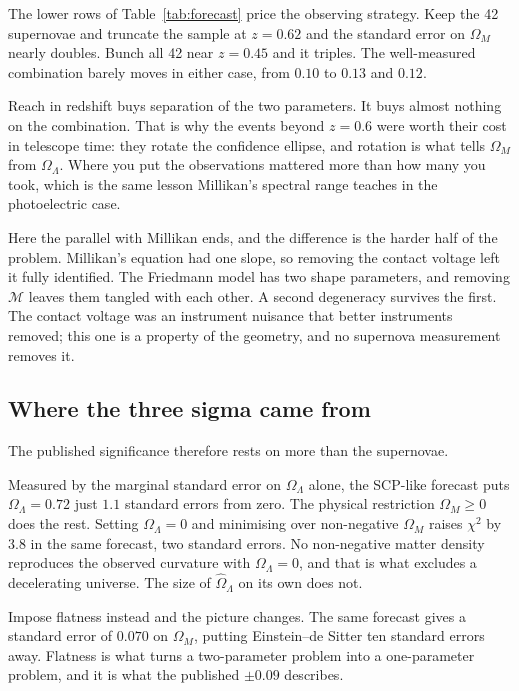 \documentclass[11pt]{article}
\begin{document}
The lower rows of Table~\ref{tab:forecast} price the observing strategy.  Keep
the 42 supernovae and truncate the sample at $z = 0.62$ and the standard error
on $\Omega_M$ nearly doubles.  Bunch all 42 near $z = 0.45$ and it triples.
The well-measured combination barely moves in either case, from $0.10$ to
$0.13$ and $0.12$.

Reach in redshift buys separation of the two parameters.  It buys almost
nothing on the combination.  That is why the events beyond $z = 0.6$ were
worth their cost in telescope time: they rotate the confidence ellipse, and
rotation is what tells $\Omega_M$ from $\Omega_\Lambda$.  Where you put the
observations mattered more than how many you took, which is the same lesson
Millikan's spectral range teaches in the photoelectric case.

Here the parallel with Millikan ends, and the difference is the harder half of
the problem.  Millikan's equation had one slope, so removing the contact
voltage left it fully identified.  The Friedmann model has two shape
parameters, and removing $\mathcal{M}$ leaves them tangled with each other.  A
second degeneracy survives the first.  The contact voltage was an instrument
nuisance that better instruments removed; this one is a property of the
geometry, and no supernova measurement removes it.

\subsection*{Where the three sigma came from}

The published significance therefore rests on more than the supernovae.

Measured by the marginal standard error on $\Omega_\Lambda$ alone, the
SCP-like forecast puts $\Omega_\Lambda = 0.72$ just $1.1$ standard errors from
zero.  The physical restriction $\Omega_M \geq 0$ does the rest.  Setting
$\Omega_\Lambda = 0$ and minimising over non-negative $\Omega_M$ raises
$\chi^2$ by $3.8$ in the same forecast, two standard errors.  No non-negative
matter density reproduces the observed curvature with $\Omega_\Lambda = 0$,
and that is what excludes a decelerating universe.  The size of
$\hat\Omega_\Lambda$ on its own does not.

Impose flatness instead and the picture changes.  The same forecast gives a
standard error of $0.070$ on $\Omega_M$, putting Einstein--de Sitter ten
standard errors away.  Flatness is what turns a two-parameter problem into a
one-parameter problem, and it is what the published $\pm 0.09$ describes.
\end{document}
